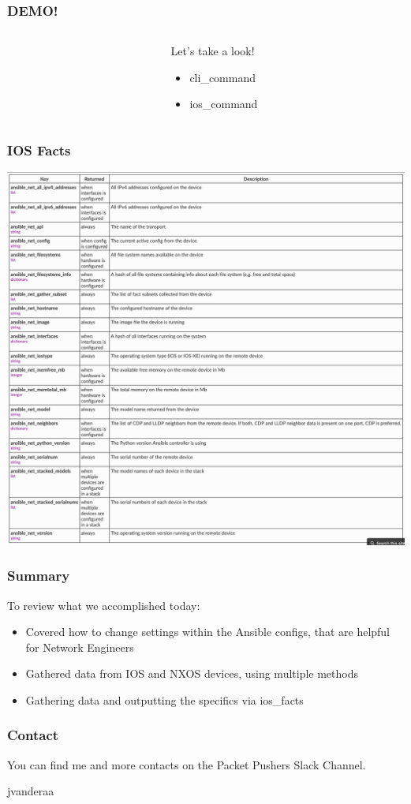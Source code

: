 \documentclass{beamer}
\begin{document}
\begin{frame}
  \frametitle{DEMO!}
  \begin{columns}
  \begin{column}{0.3\textwidth}
    \Huge
    \begin{center}
      \faDesktop 
      \hspace{.5cm}
      \faRocket     
    \end{center}
  \end{column}
  \begin{column}{0.7\textwidth}
    \huge 
    Let's take a look!
    \begin{itemize}
      \item cli\_command
      \item ios\_command
    \end{itemize}
  \end{column}
\end{columns}
\end{frame}

\begin{frame}
  \frametitle{IOS Facts}
  \includegraphics[width=\textwidth]{assets/ios_facts.png}
\end{frame}

\begin{frame}
  \frametitle{Summary}
    To review what we accomplished today:
    \begin{itemize}
      \item <2-> Covered how to change settings within the Ansible configs, that are helpful for Network Engineers
      \item <3-> Gathered data from IOS and NXOS devices, using multiple methods
      \item <4-> Gathering data and outputting the specifics via ios\_facts
    \end{itemize}
\end{frame}

\begin{frame}
  \frametitle{Contact}
  \huge
  You can find me and more contacts on the Packet Pushers Slack Channel. 
  \linebreak
  \begin{center}
    \normalsize
    \faSlack \hspace{.1cm}jvanderaa  
  \end{center}
\end{frame}
\end{document}
